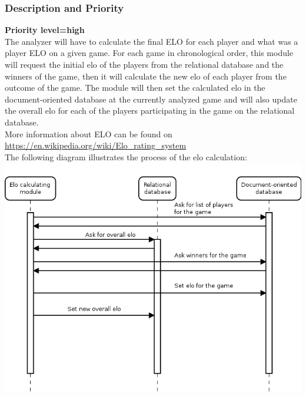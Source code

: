 \documentclass{scrreprt}
\begin{document}
\subsubsection{Description and Priority}
\textbf{Priority level=high}\\
The analyzer will have to calculate the final ELO for each player and what was a
player ELO on a given game.
For each game in chronological order, this module will request the initial elo of the players from the relational database and the winners of the game, then it will calculate the new elo of each player from the outcome of the game. The module will then set the calculated elo in the document-oriented database at the currently analyzed game and will also update the overall elo for each of the players participating in the game on the relational database.\\
More information about ELO can be found on \url{https://en.wikipedia.org/wiki/Elo_rating_system}\\
The following diagram illustrates the process of the elo calculation:\\
\includegraphics[width=\textwidth,height=\textheight,keepaspectratio]{elocalc}\\
\end{document}
